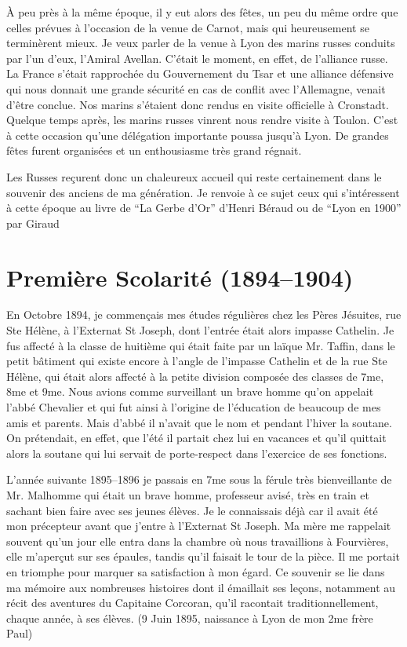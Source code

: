 \documentclass[11pt,a4paper]{report}
\begin{document}
À peu près à la même époque, il y eut alors des fêtes, un peu du même ordre que celles prévues à l'occasion de la venue de Carnot, mais qui heureusement se terminèrent mieux. Je veux parler de la venue à Lyon des marins russes conduits par l'un d'eux, l'Amiral Avellan. C'était le moment, en effet, de l'alliance russe. La France s'était rapprochée du Gouvernement du Tsar et une alliance défensive qui nous donnait une grande sécurité en cas de conflit avec l'Allemagne, venait d'être conclue. Nos marins s'étaient donc rendus en visite officielle à Cronstadt. Quelque temps après, les marins russes vinrent nous rendre visite à Toulon. C'est à cette occasion qu'une délégation importante poussa jusqu'à Lyon. De grandes fêtes furent organisées et un enthousiasme très grand régnait.

Les Russes reçurent donc un chaleureux accueil qui reste certainement dans le souvenir des anciens de ma génération. Je renvoie à ce sujet ceux qui s'intéressent à cette époque au livre de ``La Gerbe d'Or'' d'Henri Béraud ou de ``Lyon en 1900'' par Giraud

\chapter{Première Scolarité (1894--1904)}

En Octobre 1894, je commençais mes études régulières chez les Pères Jésuites, rue Ste Hélène, à l'Externat St Joseph, dont l'entrée était alors impasse Cathelin. Je fus affecté à la classe de huitième qui était faite par un laïque Mr. Taffin, dans le petit bâtiment qui existe encore à l'angle de l'impasse Cathelin et de la rue Ste Hélène, qui était alors affecté à la petite division composée des classes de 7me, 8me et 9me. Nous avions comme surveillant un brave homme qu'on appelait l'abbé Chevalier et qui fut ainsi à l'origine de l'éducation de beaucoup de mes amis et parents. Mais d'abbé il n'avait que le nom et pendant l'hiver la soutane. On prétendait, en effet, que l'été il partait chez lui en vacances et qu'il quittait alors la soutane qui lui servait de porte-respect dans l'exercice de ses fonctions.

L'année suivante 1895--1896 je passais en 7me sous la férule très bienveillante de Mr. Malhomme qui était un brave homme, professeur avisé, très en train et sachant bien faire avec ses jeunes élèves. Je le connaissais déjà car il avait été mon précepteur avant que j'entre à l'Externat St Joseph. Ma mère me rappelait souvent qu'un jour elle entra dans la chambre où nous travaillions à Fourvières, elle m'aperçut sur ses épaules, tandis qu'il faisait le tour de la pièce. Il me portait en triomphe pour marquer sa satisfaction à mon égard. Ce souvenir se lie dans ma mémoire aux nombreuses histoires dont il émaillait ses leçons, notamment au récit des aventures du Capitaine Corcoran, qu'il racontait traditionnellement, chaque année, à ses élèves. (9 Juin 1895, naissance à Lyon de mon 2me frère Paul)
\end{document}
